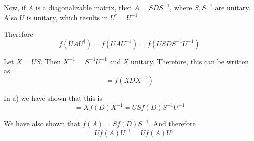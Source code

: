 \documentclass[a4paper,german,12pt,smallheadings]{scrartcl}
\begin{document}
\begin{enumerate}[a)]
    Now, if $A$ is a diagonalizable matrix, then $A=SDS^{-1}$, where $S,
    S^{-1}$ are unitary. Also $U$ is unitary, which results in $U^\dagger =
    U^{-1}$.

    Therefore
    \begin{equation*}
      f(UAU^\dagger)
      = f(UAU^{-1})
      = f(USDS^{-1}U^{-1})
    \end{equation*}

    Let $X = US$. Then $X^{-1} = S^{-1}U^{-1}$ and $X$ unitary. Therefore, this can be written as
    \begin{equation*}
      =f(XDX^{-1})
    \end{equation*}

    In a) we have shown that this is
    \begin{equation*}
      = Xf(D)X^{-1}
      = USf(D)S^{-1}U^{-1}
    \end{equation*}

    We have also shown that $f(A) = Sf(D)S^{-1}$. And therefore
    \begin{equation*}
      = Uf(A)U^{-1} = Uf(A)U^\dagger
    \end{equation*}
\end{enumerate}
\end{document}
